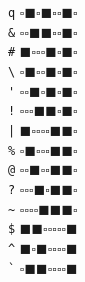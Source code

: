 \documentclass[a4paper]{article}
\begin{document}
\verb|q| $\square\blacksquare\square\blacksquare$\hspace{2cm}$\square\square\blacksquare\square$\\
\verb|&| $\square\square\blacksquare\blacksquare$\hspace{2cm}$\square\square\blacksquare\square$\\
\verb|#| $\blacksquare\square\square\square$\hspace{2cm}$\blacksquare\square\blacksquare\square$\\
\verb|\| $\square\blacksquare\square\square$\hspace{2cm}$\blacksquare\square\blacksquare\square$\\
\verb|'| $\square\square\blacksquare\square$\hspace{2cm}$\blacksquare\square\blacksquare\square$\\
\verb|!| $\square\square\square\blacksquare$\hspace{2cm}$\blacksquare\square\blacksquare\square$\\
\verb#|# $\blacksquare\square\square\square$\hspace{2cm}$\square\blacksquare\blacksquare\square$\\
\verb|%| $\square\blacksquare\square\square$\hspace{2cm}$\square\blacksquare\blacksquare\square$\\
\verb|@| $\square\square\blacksquare\square$\hspace{2cm}$\square\blacksquare\blacksquare\square$\\
\verb|?| $\square\square\square\blacksquare$\hspace{2cm}$\square\blacksquare\blacksquare\square$\\
\verb|~| $\square\square\square\square$\hspace{2cm}$\blacksquare\blacksquare\blacksquare\square$\\
\verb|$| $\blacksquare\blacksquare\square\square$\hspace{2cm}$\square\square\square\blacksquare$\\
\verb|^| $\blacksquare\square\blacksquare\square$\hspace{2cm}$\square\square\square\blacksquare$\\
\verb|`| $\square\blacksquare\blacksquare\square$\hspace{2cm}$\square\square\square\blacksquare$\\
\end{document}
